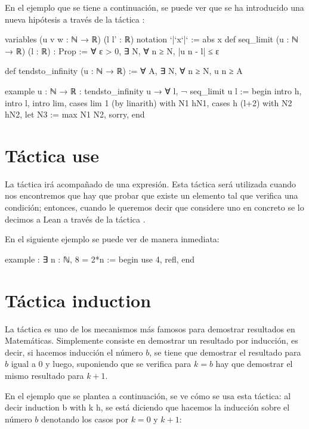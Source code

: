 En el ejemplo que se tiene a continuación, se puede ver que se ha
introducido una nueva hipótesis a través de la táctica
:

\begin{leancode}
variables (u v w : ℕ → ℝ) (l l' : ℝ)
notation `|`x`|` := abs x
def seq_limit (u : ℕ → ℝ) (l : ℝ) : Prop :=
∀ ε > 0, ∃ N, ∀ n ≥ N, |u n - l| ≤ ε

def tendsto_infinity (u : ℕ → ℝ) := ∀ A, ∃ N, ∀ n ≥ N, u n ≥ A

example {u : ℕ → ℝ} : tendsto_infinity u → ∀ l, ¬ seq_limit u l :=
begin
  intro h,
  intro l,
  intro lim,
  cases lim 1 (by linarith) with N1 hN1,
  cases h (l+2) with N2 hN2,
  let N3 := max N1 N2,
  sorry,
end
\end{leancode}

\section{Táctica use}

La táctica  irá acompañado de una expresión. Esta
táctica será utilizada cuando nos encontremos que hay que probar que
existe un elemento tal que verifica una condición; entonces, cuando le
queremos decir que considere uno en concreto se lo decimos a Lean
a través de la táctica .

En el siguiente ejemplo se puede ver de manera inmediata:

\begin{leancode}
example : ∃ n : ℕ, 8 = 2*n :=
begin
  use 4,
  refl,
end
\end{leancode}

\section{Táctica induction}

La táctica  es uno de los mecanismos más
famosos para demostrar resultados en Matemáticas. Simplemente consiste
en demostrar un resultado por inducción, es decir, si hacemos inducción
el número \(b\), se tiene que demostrar el resultado para \(b\) igual a
\(0\) y luego, suponiendo que se verifica para \(k=b\) hay que demostrar
el mismo resultado para \(k+1\).

En el ejemplo que se plantea a continuación, se ve cómo se usa esta
táctica: al decir induction b with k h, se está diciendo que hacemos la
inducción sobre el número \(b\) denotando los casos por \(k=0\) y
\(k+1\):

